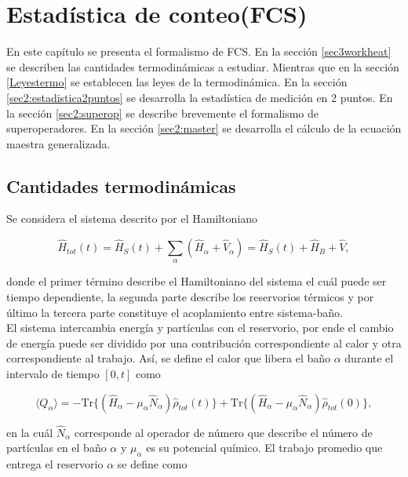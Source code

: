 \label{sec:lindblad}


\chapter{Estadística de conteo(FCS)}
En este capítulo se presenta el formalismo de FCS. En la sección \ref{sec3workheat} se describen las cantidades termodinámicas a estudiar. Mientras que en la sección \ref{Leyestermo} se establecen las leyes de la termodinámica. En la sección \ref{sec2:estadistica2puntos} se desarrolla la estadística de medición en 2 puntos. En la sección \ref{sec2:superop} se describe brevemente el formalismo de superoperadores. En la sección \ref{sec2:master} se desarrolla el cálculo de la ecuación maestra generalizada. 

\section{Cantidades termodinámicas}
Se considera el sistema descrito por el Hamiltoniano

\begin{equation*}
    \hat{H}_{tot}(t) = \hat{H}_{S}(t) + \sum_{\alpha}(\hat{H}_{\alpha} + \hat{V}_{\alpha})  = \hat{H}_{S}(t) + \hat{H}_{B} + \hat{V},
\end{equation*}

donde el primer término describe el Hamiltoniano del sistema el cuál puede ser tiempo dependiente, la segunda parte describe los reservorios térmicos y por último la tercera parte constituye el acoplamiento entre sistema-baño.\\
El sistema intercambia energía y partículas con el reservorio, por ende el cambio de energía puede ser dividido por una contribución correspondiente al calor y otra correspondiente al trabajo. Así, se define el calor que libera el baño $\alpha$ durante el intervalo de tiempo $[0,t]$ como

\begin{equation*}
    \langle Q_{\alpha}\rangle = - \text{Tr}\{(\hat{H}_{\alpha} - \mu_{\alpha}\hat{N}_{\alpha})\hat{\rho}_{tot}(t) \} + \text{Tr}\{(\hat{H}_{\alpha} - \mu_{\alpha}\hat{N}_{\alpha})\hat{\rho}_{tot}(0) \},
\end{equation*}

en la cuál $\hat{N}_{\alpha}$ corresponde al operador de número que describe el número de partículas en el baño $\alpha$ y $\mu_{\alpha}$ es su potencial químico. El trabajo promedio que entrega el reservorio $\alpha$ se define como


